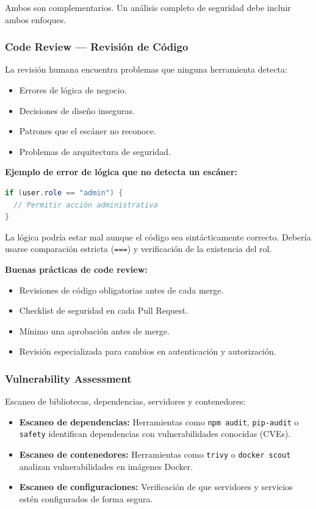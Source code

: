 Ambos son complementarios. Un análisis completo de seguridad debe incluir ambos enfoques.

\subsubsection{Code Review --- Revisión de Código}

La revisión humana encuentra problemas que ninguna herramienta detecta:

\begin{itemize}
    \item Errores de lógica de negocio.
    \item Decisiones de diseño inseguras.
    \item Patrones que el escáner no reconoce.
    \item Problemas de arquitectura de seguridad.
\end{itemize}

\textbf{Ejemplo de error de lógica que no detecta un escáner:}

\begin{lstlisting}[language=Java, caption={Lógica potencialmente incorrecta}]
if (user.role == "admin") {
  // Permitir acción administrativa
}
\end{lstlisting}

La lógica podría estar mal aunque el código sea sintácticamente correcto. Debería usarse comparación estricta (\texttt{===}) y verificación de la existencia del rol.

\textbf{Buenas prácticas de code review:}
\begin{itemize}
    \item Revisiones de código obligatorias antes de cada merge.
    \item Checklist de seguridad en cada Pull Request.
    \item Mínimo una aprobación antes de merge.
    \item Revisión especializada para cambios en autenticación y autorización.
\end{itemize}

\subsubsection{Vulnerability Assessment}

Escaneo de bibliotecas, dependencias, servidores y contenedores:

\begin{itemize}
    \item \textbf{Escaneo de dependencias:} Herramientas como \texttt{npm audit}, \texttt{pip-audit} o \texttt{safety} identifican dependencias con vulnerabilidades conocidas (CVEs).
    \item \textbf{Escaneo de contenedores:} Herramientas como \texttt{trivy} o \texttt{docker scout} analizan vulnerabilidades en imágenes Docker.
    \item \textbf{Escaneo de configuraciones:} Verificación de que servidores y servicios estén configurados de forma segura.
\end{itemize}

